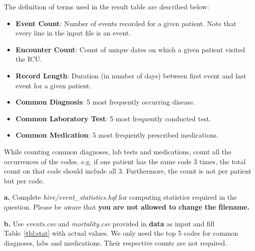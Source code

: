 \documentclass[12pt]{article}
\begin{document}
The definition of terms used in the result table are described below:
\begin{itemize}
\item \textbf{Event Count}: Number of events recorded for a given patient. Note that every line in the input file is an event. 
\item \textbf{Encounter Count}: Count of unique dates on which a given patient visited the ICU.
\item \textbf{Record Length}: Duration (in number of days) between first event and last event for a given patient.
\item \textbf{Common Diagnosis}: 5 most frequently occurring disease.
\item \textbf{Common Laboratory Test}: 5 most frequently conducted test.
\item \textbf{Common Medication}: 5 most frequently prescribed medications.
\end{itemize}
While counting common diagnoses, lab tests and medications, count all the occurrences of the codes. e.g. if one patient has the same code 3 times, the total count on that code should include all 3. Furthermore, the count is not per patient but per code.

\textbf{a.} Complete \textit{hive/event\_statistics.hql} for computing statistics required in the question. Please be aware that \textbf{\color{red} you are not allowed to change the filename.} 

\textbf{b.} Use \textit{events.csv} and \textit{mortality.csv} provided in \textbf{data} as input and fill Table~\ref{tbl:stat} with actual values. We only need the top 5 codes for common diagnoses, labs and medications. Their respective counts are not required. \\
\end{document}
